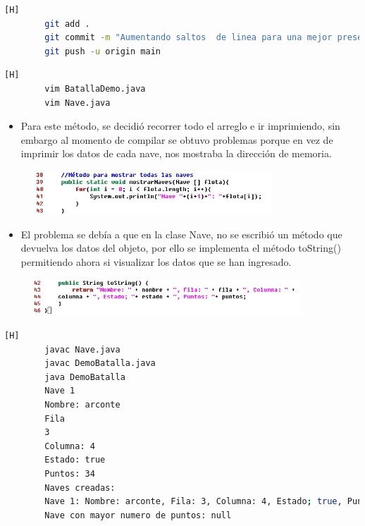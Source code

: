 \documentclass{article}
\begin{document}
	
	
	\begin{lstlisting}[language=bash,caption={Commit: Aumentando saltos de linea para una mejor presentacion y aumentando unas cosas más}][H]
		git add .
		git commit -m "Aumentando saltos  de linea para una mejor presentacion y aumentando unas cosas mas"			
		git push -u origin main
	\end{lstlisting}
	
	\begin{lstlisting}[language=bash,caption={ Completando el método mostrarNaves }][H]
		vim BatallaDemo.java
		vim Nave.java
	\end{lstlisting}
	\begin{itemize}	
		\item Para este método, se decidió recorrer todo el arreglo e ir imprimiendo, sin embargo al momento de compilar se obtuvo problemas porque en vez de imprimir los datos de cada nave, nos mostraba la dirección de memoria. 
	\end{itemize}
	\begin{figure}[H]
		\centering
		\includegraphics[width=0.8\textwidth,keepaspectratio]{img/3.jpg}
	\end{figure}
	\begin{itemize}	
		\item El problema se debía a que en la clase Nave, no se escribió un método que devuelva los datos del objeto, por ello se implementa el método toString() permitiendo ahora si visualizar los datos que se han ingresado. 
	\end{itemize}
	\begin{figure}[H]
		\centering
		\includegraphics[width=0.9\textwidth,keepaspectratio]{img/4.jpg}
	\end{figure}
	
	\begin{lstlisting}[language=bash,caption={Compilando el programa pero para ahorrar pasos, se reduce la cantidad de elementos siendo ahora de 1.}][H]
		javac Nave.java
		javac DemoBatalla.java
		java DemoBatalla
		Nave 1
		Nombre: arconte
		Fila
		3
		Columna: 4
		Estado: true
		Puntos: 34
		Naves creadas:
		Nave 1: Nombre: arconte, Fila: 3, Columna: 4, Estado; true, Puntos: 34
		Nave con mayor numero de puntos: null
	\end{lstlisting}
	
\end{document}
